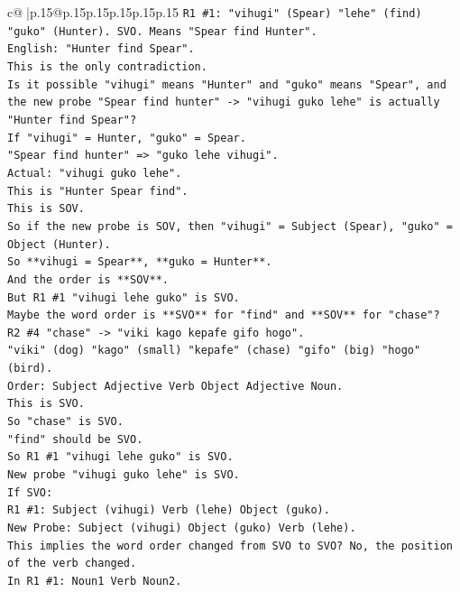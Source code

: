 \documentclass{article}
\begin{document}
{\begin{supertabular}{c@{$\;$}|p{.15\linewidth}@{}p{.15\linewidth}p{.15\linewidth}p{.15\linewidth}p{.15\linewidth}p{.15\linewidth}}
{{{\texttt{R1 \#1: "vihugi" (Spear) "lehe" (find) "guko" (Hunter). SVO. Means "Spear find Hunter".} \\
\texttt{English: "Hunter find Spear".} \\
\texttt{This is the only contradiction.} \\
\texttt{Is it possible "vihugi" means "Hunter" and "guko" means "Spear", and the new probe "Spear find hunter" {-}> "vihugi guko lehe" is actually "Hunter find Spear"?} \\
\texttt{If "vihugi" = Hunter, "guko" = Spear.} \\
\texttt{"Spear find hunter" => "guko lehe vihugi".} \\
\texttt{Actual: "vihugi guko lehe".} \\
\texttt{This is "Hunter Spear find".} \\
\texttt{This is SOV.} \\
\texttt{So if the new probe is SOV, then "vihugi" = Subject (Spear), "guko" = Object (Hunter).} \\
\texttt{So **vihugi = Spear**, **guko = Hunter**.} \\
\texttt{And the order is **SOV**.} \\
\texttt{But R1 \#1 "vihugi lehe guko" is SVO.} \\
\texttt{Maybe the word order is **SVO** for "find" and **SOV** for "chase"?} \\
\texttt{R2 \#4 "chase" {-}> "viki kago kepafe gifo hogo".} \\
\texttt{"viki" (dog) "kago" (small) "kepafe" (chase) "gifo" (big) "hogo" (bird).} \\
\texttt{Order: Subject Adjective Verb Object Adjective Noun.} \\
\texttt{This is SVO.} \\
\texttt{So "chase" is SVO.} \\
\texttt{"find" should be SVO.} \\
\texttt{So R1 \#1 "vihugi lehe guko" is SVO.} \\
\texttt{New probe "vihugi guko lehe" is SVO.} \\
\texttt{If SVO:} \\
\texttt{R1 \#1: Subject (vihugi) Verb (lehe) Object (guko).} \\
\texttt{New Probe: Subject (vihugi) Object (guko) Verb (lehe).} \\
\texttt{This implies the word order changed from SVO to SVO? No, the position of the verb changed.} \\
\texttt{In R1 \#1: Noun1 Verb Noun2.} \\
}}}
\end{supertabular}}
\end{document}
